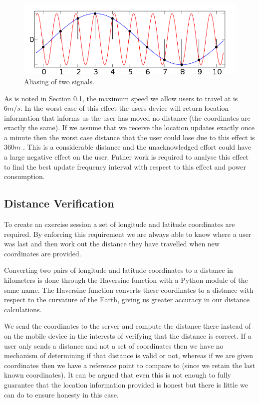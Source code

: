 \begin{figure}
  \centering
  \includegraphics[width=\textwidth]{images/aliasing.png}
  \caption{Aliasing of two signals. \cite{ailising}}
  \label{fig:ailising}
\end{figure} 

As is noted in Section \ref{sec:distance_ver}, the maximum speed we
allow users to travel at is $\text{6}m/s$. In the worst case of this
effect the users device will return location information that informs
us the user has moved no distance (the coordinates are exactly the
same). If we assume that we receive the location updates exactly once
a minute then the worst case distance that the user could lose due to
this effect is $\text{360}m$ . This is a considerable distance and the
unacknowledged effort could have a large negative effect on the
user. Futher work is required to analyse this effect to find the best
update frequency interval with respect to this effect and power
consumption. 


\subsection{Distance Verification}
\label{sec:distance_ver}
To create an exercise session a set of longitude and latitude
coordinates are required. By enforcing this requirement we are always
able to know where a user was last and then work out the distance they
have travelled when new coordinates are provided. 

Converting two pairs of longitude and latitude coordinates to a
distance in kilometers is done through the Haversine
function\cite{haversine} with a Python module of the same
name\cite{python_haversine}. The Haversine function converts these
coordinates to a distance with respect to the curvature of the Earth,
giving us greater accuracy in our distance calculations.

We send the coordinates to the server and compute the distance there
instead of on the mobile device in the interests of verifying that
the distance is correct. If a user only sends a distance and not a
set of coordinates then we have no mechanism of determining if that
distance is valid or not, whereas if we are given coordinates then we
have a reference point to compare to (since we retain the last known
coordinates). It can be argued that even this is not enough to fully
guarantee that the location information provided is honest but there
is little we can do to ensure honesty in this case. 

